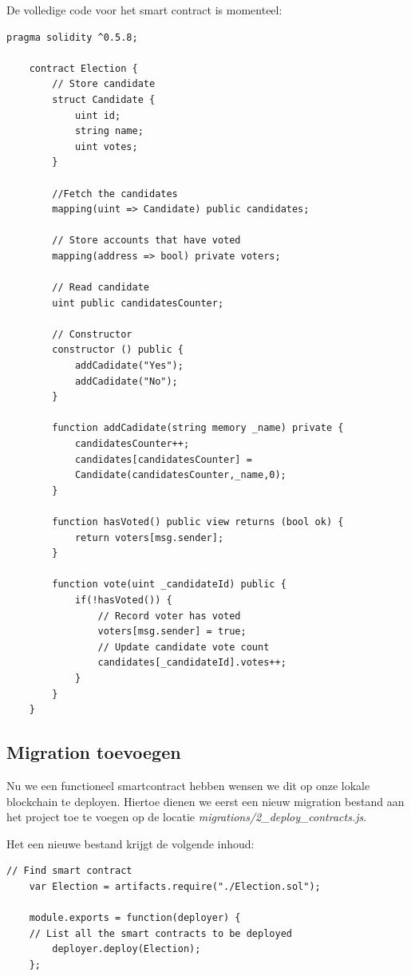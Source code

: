 	De volledige code voor het smart contract is momenteel:
	
	\lstset{language=JavaScriptSolidity} 
	\begin{lstlisting}[frame=single,  label={lst:election}] 
	pragma solidity ^0.5.8;
	
	contract Election {
		// Store candidate
		struct Candidate {
			uint id;
			string name;
			uint votes;
		}
		
		//Fetch the candidates
		mapping(uint => Candidate) public candidates;
		
		// Store accounts that have voted
		mapping(address => bool) private voters;
		
		// Read candidate
		uint public candidatesCounter;
		
		// Constructor
		constructor () public {
			addCadidate("Yes");
			addCadidate("No");
		}
	
		function addCadidate(string memory _name) private {
			candidatesCounter++;
			candidates[candidatesCounter] = 
			Candidate(candidatesCounter,_name,0);
		}
		
		function hasVoted() public view returns (bool ok) {
			return voters[msg.sender];
		}
		
		function vote(uint _candidateId) public {
			if(!hasVoted()) {
				// Record voter has voted
				voters[msg.sender] = true;
				// Update candidate vote count
				candidates[_candidateId].votes++;
			}
		}
	}

	\end{lstlisting}
	
	
	\subsection{Migration toevoegen}
	Nu we een functioneel smartcontract hebben wensen we dit op onze lokale blockchain te deployen. Hiertoe dienen we  eerst een nieuw migration bestand aan het project toe te voegen op de locatie \textit{migrations\slash 2\_deploy\_contracts.js}.  
	
	Het een nieuwe bestand krijgt de volgende inhoud:
	
	\begin{lstlisting}[frame=single]
	// Find smart contract
	var Election = artifacts.require("./Election.sol");
	
	module.exports = function(deployer) {
	// List all the smart contracts to be deployed
		deployer.deploy(Election);
	};
	\end{lstlisting}
	
